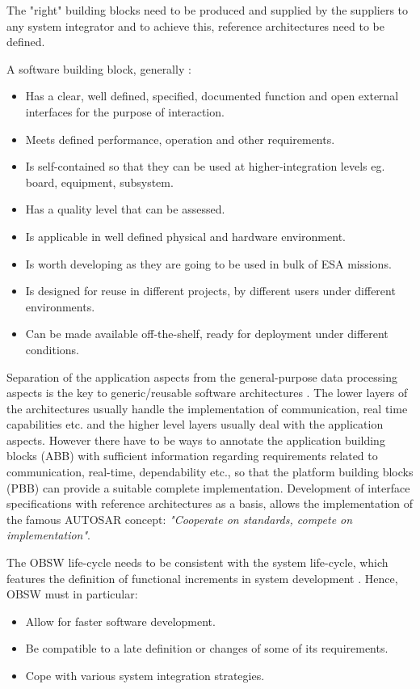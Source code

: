 The "right" building blocks need to be produced and supplied by the suppliers to any system integrator and to achieve this, reference architectures need to be defined.

A software building block, generally \cite{SAVOIR}:
\begin{itemize}
\item Has a clear, well defined, specified, documented function and open external interfaces for the purpose of interaction.
\item Meets defined performance, operation and other requirements.
\item Is self-contained so that they can be used at higher-integration levels eg. board, equipment, subsystem. 
\item Has a quality level that can be assessed.
\item Is applicable in well defined physical and hardware environment.
\item Is worth developing as they are going to be used in bulk of ESA missions.
\item Is designed for reuse in different projects, by different users under different environments.
\item Can be made available off-the-shelf, ready for deployment under different conditions.  
\end{itemize}

Separation of the application aspects from the general-purpose data processing aspects is the key to generic/reusable software architectures \cite{PhdThesis}. The lower layers of the architectures usually handle the implementation of communication, real time capabilities etc. and the higher level layers usually deal with the application aspects. However there have to be ways to annotate the application building blocks (ABB) with sufficient information regarding requirements related to communication, real-time, dependability etc., so that the platform building blocks (PBB) can provide a suitable complete implementation. Development of interface specifications with reference architectures as a basis, allows the implementation of the famous AUTOSAR concept: \textit{"Cooperate on standards, compete on implementation"}\cite{AUTOSARurl}.

The OBSW life-cycle needs to be consistent with the system life-cycle, which features the definition of functional increments in system development \cite{SAVOIR}. Hence, OBSW must in particular:

\begin{itemize}
\item Allow for faster software development.
\item Be compatible to a late definition or changes of some of its requirements.
\item Cope with various system integration strategies.
\end{itemize}


